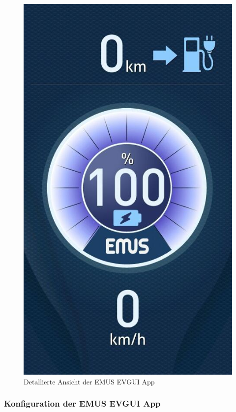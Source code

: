 \begin{figure}[H]
	\begin{center}
		\includegraphics[scale=0.4]{figures/Akku/EMUSAPP2.jpg}
		\caption{Detallierte Ansicht der EMUS EVGUI App\cite{DetaillierteApp}}
		\label{fig: Detallierte Ansicht der EMUS EVGUI App}
	\end{center}
\end{figure}
\newpage

\subsubsection{Konfiguration der EMUS EVGUI App}

